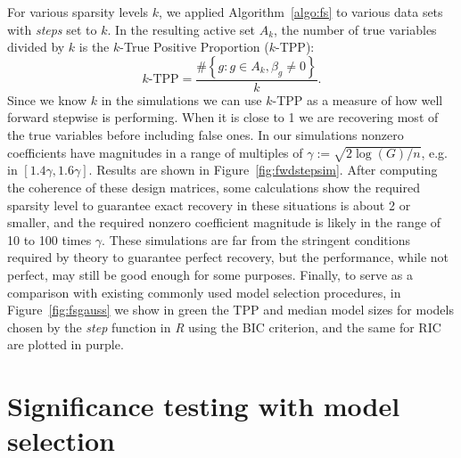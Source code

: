 \documentclass{imsart}
\begin{document}
For various sparsity levels $k$, we applied Algorithm~\ref{algo:fs} to
various data sets with \textit{steps} set to $k$.
In the resulting active set $A_k$, the number of true variables divided by $k$ is the $k$-True Positive Proportion ($k$-TPP):
\[
k\text{-TPP} = \frac{\# \left\{g: g \in A_k, \beta_g \neq 0\right\}}{k}.
\]
Since we know $k$ in the simulations we can use $k$-TPP as a measure of how well forward stepwise is performing. When it is close to 1 we are recovering most of the true variables before including false ones.
In our simulations nonzero coefficients have magnitudes
in a range of multiples of $\gamma := \sqrt{2\log(G)/n}$, e.g. in $[1.4
\gamma, 1.6 \gamma]$. Results are shown in
Figure~\ref{fig:fwdstepsim}. After computing the
coherence of these design matrices, some calculations show the required
sparsity level to guarantee exact recovery in these situations is
about 2 or smaller, and the required nonzero coefficient magnitude is
likely in the range of 10 to 100 times $\gamma$. These simulations are far
from the stringent conditions required by theory to guarantee perfect
recovery, but the performance, while not perfect, may still be good
enough for some purposes. Finally, to serve as a comparison with existing
commonly used model selection procedures, in Figure~\ref{fig:fsgauss}
we show in green the TPP and median model sizes for models chosen by
the \textit{step} function in \textit{R} using the BIC criterion, and
the same for RIC are plotted in purple.


\section{Significance testing with model selection}
\label{sec:testing}
\end{document}
